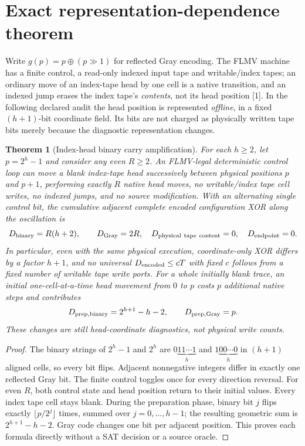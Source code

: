 \documentclass[10pt]{article}
\newtheorem{theorem}{Theorem}
\begin{document}
\section*{Exact representation-dependence theorem}
Write $g(p)=p\oplus(p\gg1)$ for reflected Gray encoding. The FLMV machine has a finite control, a read-only indexed input tape and writable/index tapes; an ordinary move of an index-tape head by one cell is a native transition, and an indexed jump erases the index tape's \emph{contents}, not its head position [1]. In the following declared audit the head position is represented \emph{offline}, in a fixed $(h+1)$-bit coordinate field. Its bits are not charged as physically written tape bits merely because the diagnostic representation changes.

\begin{theorem}[Index-head binary carry amplification]
For each $h\ge2$, let $p=2^h-1$ and consider any even $R\ge2$. An FLMV-legal deterministic control loop can move a blank index-tape head successively between physical positions $p$ and $p+1$, performing exactly $R$ native head moves, no writable/index tape cell writes, no indexed jumps, and no source modification. With an alternating single control bit, the cumulative adjacent complete \emph{encoded} configuration XOR along the oscillation is
\[
D_{\rm binary}=R(h+2),\qquad D_{\rm Gray}=2R,
\quad D_{\rm physical\ tape\ content}=0,
\quad D_{\rm endpoint}=0.
\]
In particular, even with the same physical execution, coordinate-only XOR differs by a factor $h+1$, and no universal $D_{\rm encoded}\le cT$ with fixed $c$ follows from a fixed number of writable tape write ports. For a whole initially blank trace, an initial one-cell-at-a-time head movement from $0$ to $p$ costs $p$ additional native steps and contributes
\[
D_{\rm prep,binary}=2^{h+1}-h-2,\qquad
D_{\rm prep,Gray}=p.
\]
These changes are still \emph{head-coordinate diagnostics}, not physical write counts.
\end{theorem}
\begin{proof}
The binary strings of $2^h-1$ and $2^h$ are $0\underbrace{11\cdots1}_{h}$ and $1\underbrace{00\cdots0}_{h}$ in $(h+1)$ aligned cells, so every bit flips. Adjacent nonnegative integers differ in exactly one reflected Gray bit. The finite control toggles once for every direction reversal. For even $R$, both control state and head position return to their initial values. Every index tape cell stays blank. During the preparation phase, binary bit $j$ flips exactly $\lfloor p/2^j\rfloor$ times, summed over $j=0,\ldots,h-1$; the resulting geometric sum is $2^{h+1}-h-2$. Gray code changes one bit per adjacent position. This proves each formula directly without a SAT decision or a source oracle.
\end{proof}
\end{document}
